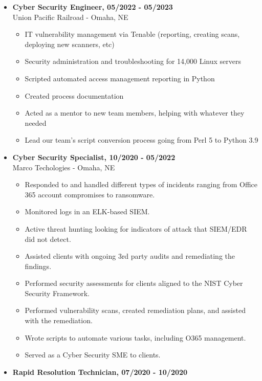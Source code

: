 \documentclass[a4paper,10pt]{article}
\begin{document}
\begin{itemize}
\begin{itemize}
    \end{itemize}
    \item\textbf{Cyber Security Engineer, 05/2022 - 05/2023} \\
    Union Pacific Railroad - Omaha, NE
    \begin{itemize}
        \small
        \leftskip=4em
        \item IT vulnerability management via Tenable (reporting, creating scans, deploying new scanners, etc)
        \item Security administration and troubleshooting for 14,000 Linux servers
        \item Scripted automated access management reporting in Python
        \item Created process documentation
        \item Acted as a mentor to new team members, helping with whatever they needed
        \item Lead our team's script conversion process going from Perl 5 to Python 3.9
    \end{itemize}
    \item\textbf{Cyber Security Specialist, 10/2020 - 05/2022} \\
    Marco Techologies - Omaha, NE
    \begin{itemize}
        \small
        \leftskip=4em
        \item Responded to and handled different types of incidents ranging from Office 365 account compromises to ransomware.
        \item Monitored logs in an ELK-based SIEM.
        \item Active threat hunting looking for indicators of attack that SIEM/EDR did not detect.
        \item Assisted clients with ongoing 3rd party audits and remediating the findings.
        \item Performed security assessments for clients aligned to the NIST Cyber Security Framework.
        \item Performed vulnerability scans, created remediation plans, and assisted with the remediation.
        \item Wrote scripts to automate various tasks, including O365 management.
        \item Served as a Cyber Security SME to clients.
    \end{itemize}
    \item\textbf{Rapid Resolution Technician, 07/2020 - 10/2020} \\

\end{itemize}
\end{document}
